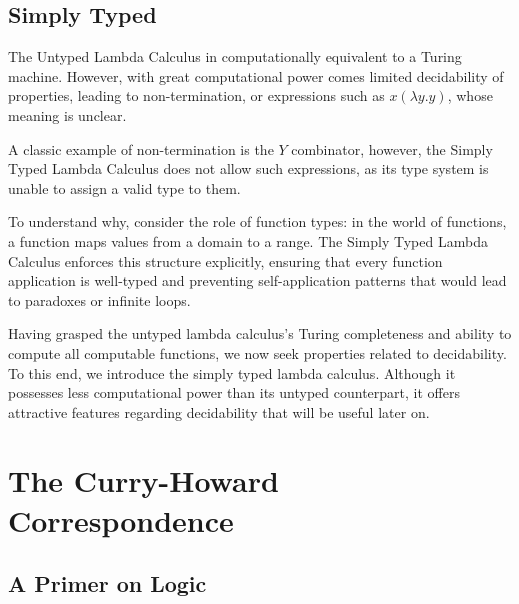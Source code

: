 \documentclass[12pt]{book}
\begin{document}
\section{\centering Simply Typed \lCalc}

The Untyped Lambda Calculus in computationally equivalent to a  Turing machine. However, with great computational power comes limited decidability of properties, leading to non-termination, or expressions such as $x(\lambda y . y)$, whose meaning is unclear.

A classic example of non-termination is the $Y$ combinator, however, the Simply Typed Lambda Calculus does not allow such expressions, as its type system is unable to assign a valid type to them.


To understand why, consider the role of function types: in the world of functions, a function maps values from a domain to a range. The Simply Typed Lambda Calculus enforces this structure explicitly, ensuring that every function application is well-typed and preventing self-application patterns that would lead to paradoxes or infinite loops.

Having grasped the untyped lambda calculus's Turing completeness and ability to compute all computable functions, we now seek properties related to decidability. To this end, we introduce the simply typed lambda calculus. Although it possesses less computational power than its untyped counterpart, it offers attractive features regarding decidability that will be useful later on.
\chapter{The Curry-Howard Correspondence}
\section*{\centering A Primer on Logic}
\end{document}

